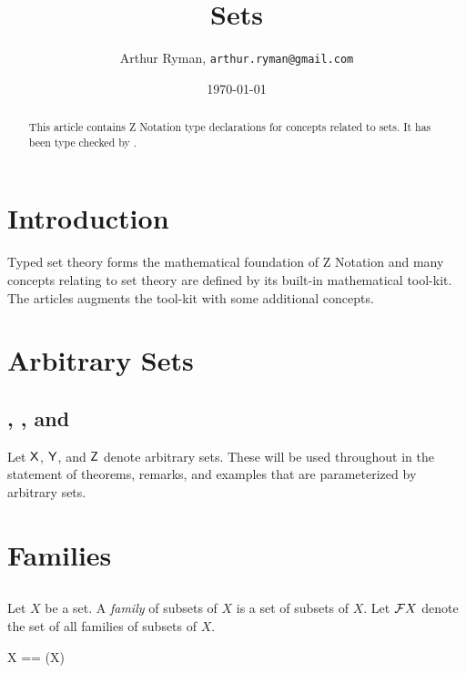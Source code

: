 \documentclass[11pt, oneside]{article}
\title{Sets}
\author{Arthur Ryman, {\tt arthur.ryman@gmail.com}}
\date{\today}
\begin{document}
\maketitle

\begin{abstract}
This article contains Z Notation type declarations for concepts related to sets.
It has been type checked by \fuzz.
\end{abstract}

\section{Introduction}

Typed set theory forms the mathematical foundation of Z Notation
and many concepts relating to set theory are defined by its built-in mathematical tool-kit. 
The articles augments the tool-kit with some additional concepts.

\section{Arbitrary Sets}

\subsection{, , and }

Let $\mathsf{X}$, $\mathsf{Y}$, and $\mathsf{Z}$ denote arbitrary sets.
These will be used throughout in the statement of theorems, remarks, and examples that are parameterized
by arbitrary sets.

\begin{zed}
	[\setX, \setY, \setZ]
\end{zed}

\section{Families}

\subsection{}

Let $X$ be a set.
A {\it family} of subsets of $X$ is a set of subsets of $X$.
Let $\mathcal{F} X$ denote the set of all families of subsets of $X$.

\begin{zed}
	\family X == \power(\power X)
\end{zed}
\end{document}
